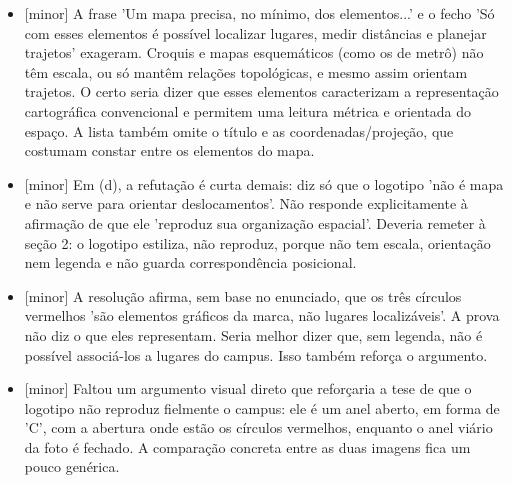 \documentclass{article}%
\begin{document}
\begin{itemize}%
\item%
{[}minor{]} A frase 'Um mapa precisa, no mínimo, dos elementos...' e o fecho 'Só com esses elementos é possível localizar lugares, medir distâncias e planejar trajetos' exageram. Croquis e mapas esquemáticos (como os de metrô) não têm escala, ou só mantêm relações topológicas, e mesmo assim orientam trajetos. O certo seria dizer que esses elementos caracterizam a representação cartográfica convencional e permitem uma leitura métrica e orientada do espaço. A lista também omite o título e as coordenadas/projeção, que costumam constar entre os elementos do mapa.%
\item%
{[}minor{]} Em (d), a refutação é curta demais: diz só que o logotipo 'não é mapa e não serve para orientar deslocamentos'. Não responde explicitamente à afirmação de que ele 'reproduz sua organização espacial'. Deveria remeter à seção 2: o logotipo estiliza, não reproduz, porque não tem escala, orientação nem legenda e não guarda correspondência posicional.%
\item%
{[}minor{]} A resolução afirma, sem base no enunciado, que os três círculos vermelhos 'são elementos gráficos da marca, não lugares localizáveis'. A prova não diz o que eles representam. Seria melhor dizer que, sem legenda, não é possível associá{-}los a lugares do campus. Isso também reforça o argumento.%
\item%
{[}minor{]} Faltou um argumento visual direto que reforçaria a tese de que o logotipo não reproduz fielmente o campus: ele é um anel aberto, em forma de 'C', com a abertura onde estão os círculos vermelhos, enquanto o anel viário da foto é fechado. A comparação concreta entre as duas imagens fica um pouco genérica.%
\end{itemize}%
\end{document}
